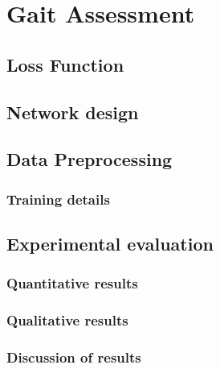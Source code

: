 
\chapter{Gait Assessment}\label{chapter:gait}

\section{Loss Function}

\section{Network design}

\section{Data Preprocessing}

\subsection{Training details}

\section{Experimental evaluation}

\subsection{Quantitative results}
\subsection{Qualitative results}
\subsection{Discussion of results}